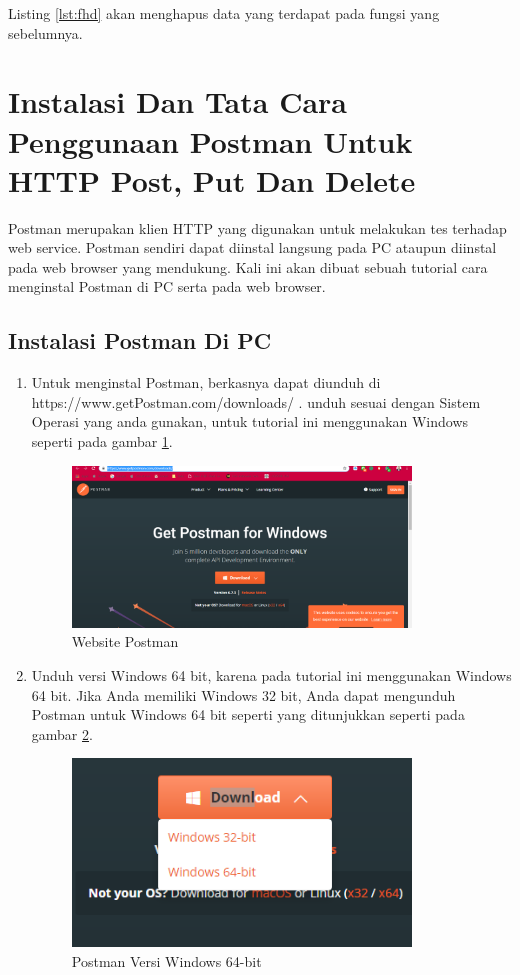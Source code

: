 Listing \ref{lst:fhd} akan menghapus data yang terdapat pada fungsi yang sebelumnya.

\section{Instalasi Dan Tata Cara Penggunaan Postman Untuk HTTP Post, Put Dan Delete} 
Postman merupakan klien HTTP yang digunakan untuk melakukan tes terhadap web service. Postman sendiri dapat diinstal langsung pada PC ataupun diinstal pada web browser yang mendukung. Kali ini akan dibuat sebuah tutorial cara menginstal Postman di PC serta pada web browser.
\subsection{Instalasi Postman Di PC}
\begin{enumerate}
\item Untuk menginstal Postman, berkasnya dapat diunduh di https://www.getPostman.com/downloads/ . unduh sesuai dengan Sistem Operasi yang anda gunakan, untuk tutorial ini menggunakan Windows seperti pada gambar \ref{fig:wp}.
\begin{figure}[!htbp]
	\centerline{\includegraphics[width=0.85\textwidth]{figures/11/wp.PNG}}
	\caption{Website Postman}
	\label{fig:wp}
\end{figure}

\item Unduh versi Windows 64 bit, karena pada tutorial ini menggunakan Windows 64 bit. Jika Anda memiliki Windows 32 bit, Anda dapat mengunduh Postman untuk Windows 64 bit seperti yang ditunjukkan seperti pada gambar \ref{fig:pvw}.
\begin{figure}[!htbp]
	\centerline{\includegraphics[width=0.85\textwidth]{figures/11/pvw.PNG}}
	\caption{Postman Versi Windows 64-bit}
	\label{fig:pvw}
\end{figure}


\end{enumerate}

